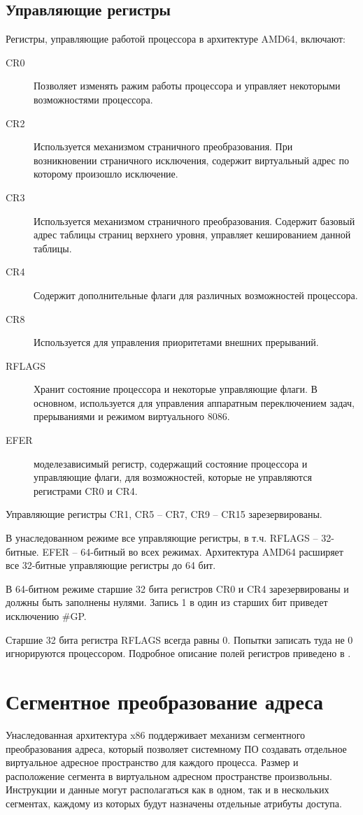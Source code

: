 \subsection*{Управляющие регистры}
Регистры, управляющие работой процессора в архитектуре AMD64, включают:
\begin{description}
	\item[CR0] Позволяет изменять ражим работы процессора и управляет некоторыми возможностями процессора.
	\item[CR2] Используется механизмом страничного преобразования. При возникновении страничного исключения, содержит
		виртуальный адрес по которому произошло исключение.
	\item[CR3] Используется механизмом страничного преобразования. Содержит базовый адрес таблицы страниц верхнего
		уровня, управляет кешированием данной таблицы.
	\item[CR4] Содержит дополнительные флаги для различных возможностей процессора.
	\item[CR8] Используется для управления приоритетами внешних прерываний.
	\item[RFLAGS] Хранит состояние процессора и некоторые управляющие флаги. В основном, используется для
		управления аппаратным переключением задач, прерываниями и режимом виртуального 8086.
	\item[EFER] моделезависимый регистр, содержащий состояние процессора и управляющие флаги, для
		возможностей, которые не управляются регистрами CR0 и CR4.
\end{description}

Управляющие регистры CR1, CR5 -- CR7, CR9 -- CR15 зарезервированы.

В унаследованном режиме все управляющие регистры, в т.ч. RFLAGS -- 32-битные. EFER -- 64-битный во всех режимах.
Архитектура AMD64 расширяет все 32-битные управляющие регистры до 64 бит.

В 64-битном режиме старшие 32 бита регистров CR0 и CR4 зарезервированы и должны быть заполнены нулями.
Запись 1 в один из старших бит приведет исключению \#GP.

Старшие 32 бита регистра RFLAGS всегда равны 0. Попытки записать туда не 0 игнорируются процессором.
Подробное описание полей регистров приведено в \cite[стр. 42]{amd_pm_v2}.



\section{Сегментное преобразование адреса}
Унаследованная архитектура x86 поддерживает механизм сегментного преобразования адреса, который
позволяет системному ПО создавать отдельное виртуальное адресное пространство для каждого процесса.
Размер и расположение сегмента в виртуальном адресном пространстве произвольны. Инструкции и данные
могут располагаться как в одном, так и в нескольких сегментах, каждому из которых будут назначены
отдельные атрибуты доступа.

